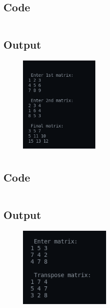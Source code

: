 \documentclass[12pt]{article}
\begin{document}
\newpage
\section{}
\subsection{Code}
\inputminted{c}{q4.c}
\subsection{Output}
\begin{figure}[h]
    \centering
    \includegraphics[width=0.35\textwidth]{4.png}
\end{figure}

\newpage
\section{}
\subsection{Code}
\inputminted{c}{q5.c}
\subsection{Output}
\begin{figure}[h]
    \centering
    \includegraphics[width=0.4\textwidth]{5.png}
\end{figure}

\newpage
\end{document}
